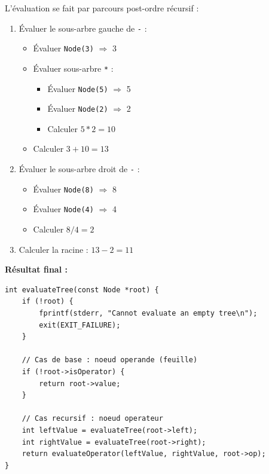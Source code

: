 \documentclass[12pt,a4paper]{article}
\begin{document}
L'évaluation se fait par parcours post-ordre récursif :

\begin{enumerate}
    \item Évaluer le sous-arbre gauche de \texttt{-} :
    \begin{itemize}
        \item Évaluer \texttt{Node(3)} $\Rightarrow$ 3
        \item Évaluer sous-arbre \texttt{*} :
        \begin{itemize}
            \item Évaluer \texttt{Node(5)} $\Rightarrow$ 5
            \item Évaluer \texttt{Node(2)} $\Rightarrow$ 2
            \item Calculer $5 * 2 = 10$
        \end{itemize}
        \item Calculer $3 + 10 = 13$
    \end{itemize}
    \item Évaluer le sous-arbre droit de \texttt{-} :
    \begin{itemize}
        \item Évaluer \texttt{Node(8)} $\Rightarrow$ 8
        \item Évaluer \texttt{Node(4)} $\Rightarrow$ 4
        \item Calculer $8 / 4 = 2$
    \end{itemize}
    \item Calculer la racine : $13 - 2 = 11$
\end{enumerate}

\textbf{Résultat final :} 

\begin{lstlisting}[caption={Fonction d'évaluation récursive}]
int evaluateTree(const Node *root) {
    if (!root) {
        fprintf(stderr, "Cannot evaluate an empty tree\n");
        exit(EXIT_FAILURE);
    }

    // Cas de base : noeud operande (feuille)
    if (!root->isOperator) {
        return root->value;
    }

    // Cas recursif : noeud operateur
    int leftValue = evaluateTree(root->left);
    int rightValue = evaluateTree(root->right);
    return evaluateOperator(leftValue, rightValue, root->op);
}
\end{lstlisting}

\end{document}
